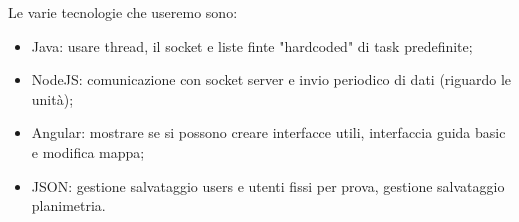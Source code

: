 	Le varie tecnologie che useremo sono:
	\begin{itemize}
		\item {Java:} usare thread, il socket e liste finte "hardcoded" di task predefinite;
		\item {NodeJS:} comunicazione con socket server e invio periodico di dati (riguardo le unità);
		\item {Angular:} mostrare se si possono creare interfacce utili, interfaccia guida basic e modifica mappa;
		\item {JSON:} gestione salvataggio users e utenti fissi per prova, gestione salvataggio planimetria.
	\end{itemize}




	